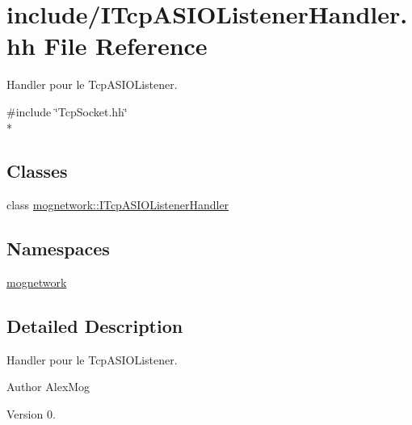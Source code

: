 \hypertarget{_i_tcp_a_s_i_o_listener_handler_8hh}{\section{include/\-I\-Tcp\-A\-S\-I\-O\-Listener\-Handler.hh File Reference}
\label{_i_tcp_a_s_i_o_listener_handler_8hh}
}


Handler pour le Tcp\-A\-S\-I\-O\-Listener.  


{\ttfamily \#include \char`\"{}Tcp\-Socket.\-hh\char`\"{}}\\*
\subsection*{Classes}
\begin{DoxyCompactItemize}
\item 
class \hyperlink{classmognetwork_1_1_i_tcp_a_s_i_o_listener_handler}{mognetwork\-::\-I\-Tcp\-A\-S\-I\-O\-Listener\-Handler}
\end{DoxyCompactItemize}
\subsection*{Namespaces}
\begin{DoxyCompactItemize}
\item 
\hyperlink{namespacemognetwork}{mognetwork}
\end{DoxyCompactItemize}


\subsection{Detailed Description}
Handler pour le Tcp\-A\-S\-I\-O\-Listener. \begin{DoxyAuthor}{Author}
Alex\-Mog 
\end{DoxyAuthor}
\begin{DoxyVersion}{Version}
0. 
\end{DoxyVersion}
